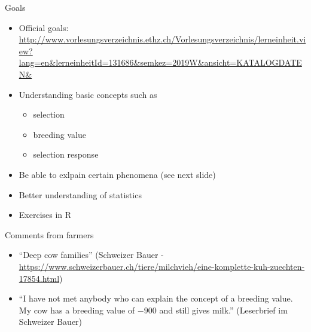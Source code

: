 \documentclass[ignorenonframetext,]{beamer}
\providecommand{\tightlist}{%
  \setlength{\itemsep}{0pt}\setlength{\parskip}{0pt}}
\begin{document}
\begin{frame}{Goals}
\protect\hypertarget{goals}{}

\begin{itemize}
\tightlist
\item
  Official goals:
  \url{http://www.vorlesungsverzeichnis.ethz.ch/Vorlesungsverzeichnis/lerneinheit.view?lang=en\&lerneinheitId=131686\&semkez=2019W\&ansicht=KATALOGDATEN\&}
\item
  Understanding basic concepts such as

  \begin{itemize}
  \tightlist
  \item
    selection
  \item
    breeding value
  \item
    selection response
  \end{itemize}
\item
  Be able to exlpain certain phenomena (see next slide)
\item
  Better understanding of statistics
\item
  Exercises in R
\end{itemize}


\end{frame}

\begin{frame}{Comments from farmers}
\protect\hypertarget{comments-from-farmers}{}

\begin{itemize}
\tightlist
\item
  ``Deep cow families'' (Schweizer Bauer -
  \url{https://www.schweizerbauer.ch/tiere/milchvieh/eine-komplette-kuh-zuechten-17854.html})
\item
  ``I have not met anybody who can explain the concept of a breeding
  value. My cow has a breeding value of \(-900\) and still gives milk.''
  (Leserbrief im Schweizer Bauer)
\end{itemize}


\end{frame}
\end{document}
